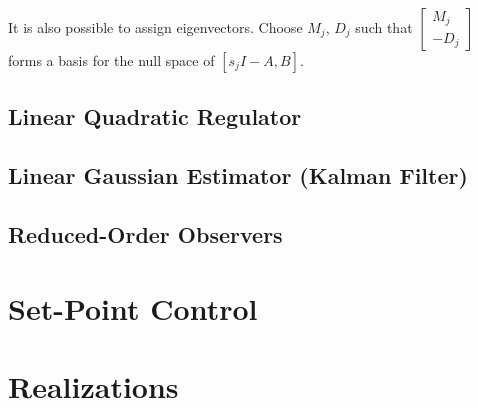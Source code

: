 \documentclass{article}
\begin{document}
It is also possible to assign eigenvectors. Choose $M_j$, $D_j$ such that
$
\left[\begin{array}{r}
  M_j \\ -D_j
\end{array}\right]
$
forms a basis for the null space of $[s_j I - A, B]$.

\subsection{Linear Quadratic Regulator}

\subsection{Linear Gaussian Estimator (Kalman Filter)}

\subsection{Reduced-Order Observers}

\section{Set-Point Control}

\section{Realizations}
\end{document}
